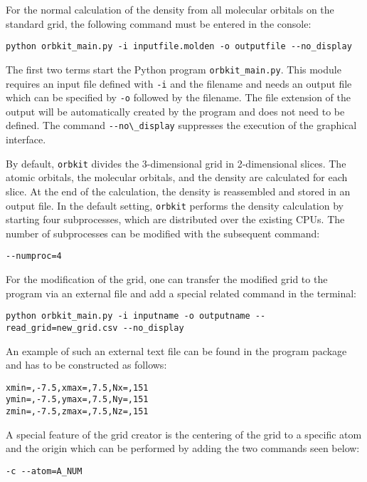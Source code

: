 \documentclass[a4paper,10pt]{scrartcl}
\begin{document}
For the normal calculation of the density from all molecular orbitals
on the standard grid, the following command must be entered in the
console: 

\begin{verbatim}
python orbkit_main.py -i inputfile.molden -o outputfile --no_display
\end{verbatim}


The first two terms start the Python program \verb!orbkit_main.py!. This module
requires an input file defined with \texttt{-i} and the filename and
needs an output file which can be specified by \texttt{-o} followed
by the filename. The file extension of the output will be automatically
created by the program and does not need to be defined. The command
\verb!--no\_display! suppresses the execution of the graphical
interface.

By default, \texttt{orbkit} divides the 3-dimensional grid in 2-dimensional
slices. The atomic orbitals, the molecular orbitals, and the density
are calculated for each slice. At the end of the calculation, the
density is reassembled and stored in an output file. In the default
setting, \texttt{orbkit} performs the density calculation by starting four
subprocesses, which are distributed over the existing CPUs. The number
of subprocesses can be modified with the subsequent command: 
\begin{verbatim}
--numproc=4
\end{verbatim}


For the modification of the grid, one can transfer the modified grid
to the program via an external file and add a special related command
in the terminal: 

\begin{verbatim}
python orbkit_main.py -i inputname -o outputname --read_grid=new_grid.csv --no_display
\end{verbatim}


An example of such an external text file can be found in the program
package and has to be constructed as follows: 

\begin{verbatim}
xmin=,-7.5,xmax=,7.5,Nx=,151
ymin=,-7.5,ymax=,7.5,Ny=,151
zmin=,-7.5,zmax=,7.5,Nz=,151
\end{verbatim}


A special feature of the grid creator is the centering of the grid
to a specific atom and the origin which can be performed by adding
the two commands seen below: 

\begin{verbatim}
-c --atom=A_NUM
\end{verbatim}
\end{document}
